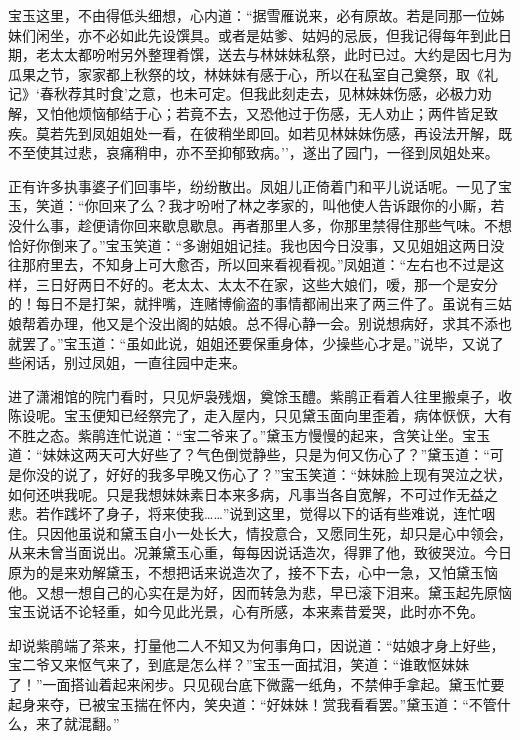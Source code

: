 宝玉这里，不由得低头细想，心内道：``据雪雁说来，必有原故。若是同那一位姊妹们闲坐，亦不必如此先设馔具。或者是姑爹、姑妈的忌辰，但我记得每年到此日期，老太太都吩咐另外整理肴馔，送去与林妹妹私祭，此时已过。大约是因七月为瓜果之节，家家都上秋祭的坟，林妹妹有感于心，所以在私室自己奠祭，取《礼记》`春秋荐其时食'之意，也未可定。但我此刻走去，见林妹妹伤感，必极力劝解，又怕他烦恼郁结于心；若竟不去，又恐他过于伤感，无人劝止；两件皆足致疾。莫若先到凤姐姐处一看，在彼稍坐即回。如若见林妹妹伤感，再设法开解，既不至使其过悲，哀痛稍申，亦不至抑郁致病。''，遂出了园门，一径到凤姐处来。

正有许多执事婆子们回事毕，纷纷散出。凤姐儿正倚着门和平儿说话呢。一见了宝玉，笑道：``你回来了么？我才吩咐了林之孝家的，叫他使人告诉跟你的小厮，若没什么事，趁便请你回来歇息歇息。再者那里人多，你那里禁得住那些气味。不想恰好你倒来了。''宝玉笑道：``多谢姐姐记挂。我也因今日没事，又见姐姐这两日没往那府里去，不知身上可大愈否，所以回来看视看视。''凤姐道：``左右也不过是这样，三日好两日不好的。老太太、太太不在家，这些大娘们，嗳，那一个是安分的！每日不是打架，就拌嘴，连赌博偷盗的事情都闹出来了两三件了。虽说有三姑娘帮着办理，他又是个没出阁的姑娘。总不得心静一会。别说想病好，求其不添也就罢了。''宝玉道：``虽如此说，姐姐还要保重身体，少操些心才是。''说毕，又说了些闲话，别过凤姐，一直往园中走来。

进了潇湘馆的院门看时，只见炉袅残烟，奠馀玉醴。紫鹃正看着人往里搬桌子，收陈设呢。宝玉便知已经祭完了，走入屋内，只见黛玉面向里歪着，病体恹恹，大有不胜之态。紫鹃连忙说道：``宝二爷来了。''黛玉方慢慢的起来，含笑让坐。宝玉道：``妹妹这两天可大好些了？气色倒觉静些，只是为何又伤心了？''黛玉道：``可是你没的说了，好好的我多早晚又伤心了？''宝玉笑道：``妹妹脸上现有哭泣之状，如何还哄我呢。只是我想妹妹素日本来多病，凡事当各自宽解，不可过作无益之悲。若作践坏了身子，将来使我\ldots{}\ldots{}''说到这里，觉得以下的话有些难说，连忙咽住。只因他虽说和黛玉自小一处长大，情投意合，又愿同生死，却只是心中领会，从来未曾当面说出。况兼黛玉心重，每每因说话造次，得罪了他，致彼哭泣。今日原为的是来劝解黛玉，不想把话来说造次了，接不下去，心中一急，又怕黛玉恼他。又想一想自己的心实在是为好，因而转急为悲，早已滚下泪来。黛玉起先原恼宝玉说话不论轻重，如今见此光景，心有所感，本来素昔爱哭，此时亦不免。

却说紫鹃端了茶来，打量他二人不知又为何事角口，因说道：``姑娘才身上好些，宝二爷又来怄气来了，到底是怎么样？''宝玉一面拭泪，笑道：``谁敢怄妹妹了！''一面搭讪着起来闲步。只见砚台底下微露一纸角，不禁伸手拿起。黛玉忙要起身来夺，已被宝玉揣在怀内，笑央道：``好妹妹！赏我看看罢。''黛玉道：``不管什么，来了就混翻。''

